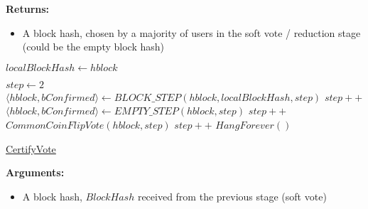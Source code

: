 \documentclass[10pt,a4paper]{article}
\begin{document}
\noindent \textbf{Returns:}
\begin{itemize}
    \item A block hash, chosen by a majority of users in the soft vote / reduction stage 
    (could be the empty block hash)
  \end{itemize}

\begin{algorithm}[H]
    \begin{algorithmic}[H]
    \State $localBlockHash \gets hblock$

    \State $step \gets 2$
        \\
        \State $\langle hblock, bConfirmed \rangle \gets BLOCK\_STEP(hblock, localBlockHash, step)$
        \EndIf
        \State $step++$\\
   
        \State $ \langle hblock, bConfirmed \rangle \gets EMPTY\_STEP(hblock,step)$
        \EndIf
        \State $step++$\\

        \State $CommonCoinFlipVote(hblock, step)$
        \State $step++$
    \EndWhile
    \State $HangForever()$
    \EndFunction
    \end{algorithmic}
    \caption{\underline{CertifyVote}}
\end{algorithm}

\noindent \textbf{Arguments:}
\begin{itemize}
    \item A block hash, $BlockHash$ received from the previous stage (soft vote)
  \end{itemize}
\end{document}
